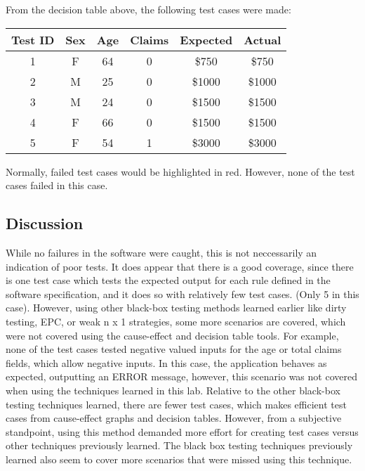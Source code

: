 From the decision table above, the following test cases were made:
\vspace{20pt}

\begin{adjustbox}{center}
	\begin{tabular}{cccccc}
		Test ID & Sex & Age & Claims & Expected & Actual \\ \hline
		1       & F   & 64  & 0      & \$750    & \$750  \\
		2       & M   & 25  & 0      & \$1000   & \$1000 \\
		3       & M   & 24  & 0      & \$1500   & \$1500 \\
		4       & F   & 66  & 0      & \$1500   & \$1500 \\
		5       & F   & 54  & 1      & \$3000   & \$3000 \\
	\end{tabular}%
\end{adjustbox}
Normally, failed test cases would be highlighted in red. However, none of the
test cases failed in this case.

\subsection{Discussion}
While no failures in the software were caught, this is not neccessarily an
indication of poor tests. It does appear that there is a good coverage, since
there is one test case which tests the expected output for each rule defined in
the software specification, and it does so with relatively few test cases.
(Only 5 in this case). However, using other black-box testing methods learned
earlier like dirty testing, EPC, or weak n x 1 strategies, some more scenarios
are covered, which were not covered using the cause-effect and decision table
tools. For example, none of the test cases tested negative valued
inputs for the age or total claims fields, which allow negative inputs. In this
case, the application behaves as expected, outputting an ERROR message,
however, this scenario was not covered when using the techniques learned in
this lab. Relative to the other black-box testing techniques learned, there are
fewer test cases, which makes efficient test cases from cause-effect graphs and
decision tables. However, from a subjective standpoint, using this method
demanded more effort for creating test cases versus other techniques
previously learned. The black box testing techniques previously learned also
seem to cover more scenarios that were missed using this technique.
